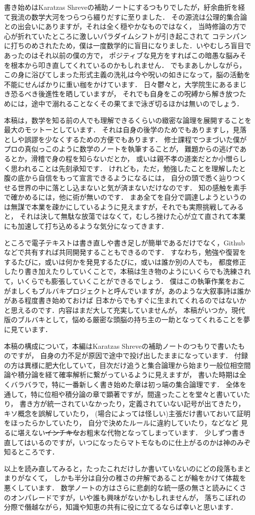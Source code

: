 
書き始めはKaratzas Shreveの補助ノートにするつもりでしたが，紆余曲折を経て我流の数学大河をつらつら綴りだすに至りました．
その源流は公理的集合論との出会いにありますが，それは全く穏やかなものではなく，
当時修論の方で心が折れていたところに激しいパラダイムシフトが引き起こされて
コテンパンに打ちのめされたため，僕は一度数学的に盲目になりました．いやむしろ盲目であったのはそれ以前の僕の方で，
ポジティブな見方をすればこの暗愚な脳みそを根本から叩き直してくれているのかもしれません．
でもまあしかしながら，この身に浴びてしまった形式主義の洗礼は今や呪いの如きになって，脳の活動を不能にせんばかりに重い枷をかけています．
日々鬱々と，大学院生にあるまじき恐るべき後進性を晒していますが，
それでも自身をこの呪縛から解き放つためには，途中で溺れることなくその果てまで泳ぎ切るほかは無いのでしょう．

本稿は，数学を知る前の人でも理解できるくらいの緻密な論理を展開することを最大のモットーとしています．
それは自身の後学のためでもありますし，見落としや誤謬を少なくするための方便でもあります．
修士課程でつまづいた僕がプロの真似っこのように数学のノートを執筆することが，
難題からの逃げであるとか，滑稽で身の程を知らないだとか，
或いは親不孝の道楽だとか小憎らしく思われることは先刻承知です．
けれども，ただ，勉強したことを理解したと腹の底から自信をもって宣言できるようになるには，
自分の頭で悉く辿りつくせる世界の中に落とし込まないと気が済まないだけなのです．
知の感触を素手で確かめるには，他に術が無いのです．
まあ全てを自分で調達しようというのは無謀で本業を疎かにしているように見えますが，それでも実際挑戦してみると，
それは決して無駄な放蕩ではなくて，むしろ挫けた心が立て直されて本業にも加速して打ち込めるような気分になってきます．

ところで電子テキストは書き直しや書き足しが簡単であるだけでなく，Githubなどで共有すれば共同開発することもできるのです．
すなわち，勉強や復習をするたびに，或いは何かを発見するたびに，或いは誰か別の人でも，
都度修正したり書き加えたりしていくことで，本稿は生き物のようにいくらでも洗練されて，いくらでも膨張していくことができるでしょう．
僕はこの執筆作業をおこがましくもブルバキプロジェクトと呼んでいますが，あのような大叙事詩は誰かがある程度書き始めておけば
日本からでもすぐに生まれてくれるのではないかと思えるのです．内容はまだ大して充実していませんが，
本稿がいつか，現代版のブルバキとして，悩める厳密な頭脳の持ち主の一助となってくれることを夢に見ています．

本稿の構成について，本編はKaratzas Shreveの補助ノートのつもりで書いたものですが，
自身の力不足が原因で途中で投げ出したままになっています．
付録の方は異様に肥大化していて，目次だけ追うと集合論理から始まり一般位相空間論や積分論を経て確率解析に繋がっているように見えますが，
書いた時期は全くバラバラで，特に一番新しく書き始めた章は初っ端の集合論理です．
全体を通して，特に位相や積分論の章で顕著ですが，間違ったことを堂々と書いていたり，
書き方が統一されていなかったり，定義されていない記号が出てきたり，キソ概念を誤解していたり，
(場合によっては怪しい)主張だけ書いておいて証明をほったらかしていたり，
自分で決めたルールに違約していたり，などなど
見るに堪えない\sout{インチキな}お粗末な代物となってしまっています．
少しずつ書き直してはいるのですが，いつになったらマトモなものに仕上がるのかは神のみぞ知るところです．

以上を読み直してみると，たったこれだけしか書いていないのにどの段落もまとまりがなくて，
しかも半分は自分の稚さの弁解であることが輪をかけて体裁を悪くしています．
数学ノートの方はさらに悲劇的な統一感の無さと読みにくさのオンパレードですが，いや誰も興味がないかもしれませんが，
落ちこぼれの分際で僭越ながら，知識や知恵の共有に役に立てるならば幸いと思います．

